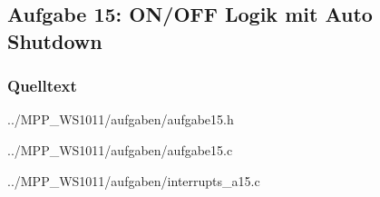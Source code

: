 \subsection*{Aufgabe 15: ON/OFF Logik mit Auto Shutdown}

\subsubsection*{Quelltext}

{../MPP_WS1011/aufgaben/aufgabe15.h}


{../MPP_WS1011/aufgaben/aufgabe15.c}


{../MPP_WS1011/aufgaben/interrupts_a15.c}
